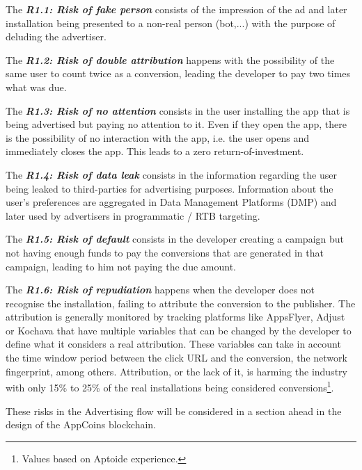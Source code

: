 \begin{tcolorbox}[enhanced jigsaw,sharp corners, drop fuzzy shadow=ShadowColor]

The {\bf\em R1.1: Risk of fake person} consists of the impression of the ad and later installation being presented to a non-real person (bot,...) with the purpose of deluding the advertiser. 


The {\bf\em R1.2: Risk of double attribution} happens with the possibility of the same user to count twice as a conversion, leading the developer to pay two times what was due.


The {\bf\em R1.3: Risk of no attention} consists in the user installing the app that is being advertised but paying no attention to it. Even if they open the app, there is the possibility of no interaction with the app, i.e. the user opens and immediately closes the app. This leads to a zero return-of-investment.


The {\bf\em R1.4: Risk of data leak} consists in the information regarding the user being leaked to third-parties for advertising purposes. Information about the user's preferences are aggregated in Data Management Platforms (DMP) and later used by advertisers in programmatic / RTB targeting. 

The {\bf\em R1.5: Risk of default} consists in the developer creating a campaign but not having enough funds to pay the conversions that are generated in that campaign, leading to him not paying the due amount.


The {\bf\em R1.6: Risk of repudiation} happens when the developer does not recognise the installation, failing to attribute the conversion to the publisher. The attribution is generally monitored by tracking platforms like AppsFlyer, Adjust or Kochava that have multiple variables that can be changed by the developer to define what it considers a real attribution. These variables can take in account the time window period between the click URL and the conversion, the network fingerprint, among others. Attribution, or the lack of it, is harming the industry with only 15\% to 25\% of the real installations being considered conversions\footnote{Values based on Aptoide experience.}.


\end{tcolorbox}

These risks in the Advertising flow will be considered in a section ahead in the design of the AppCoins blockchain.


